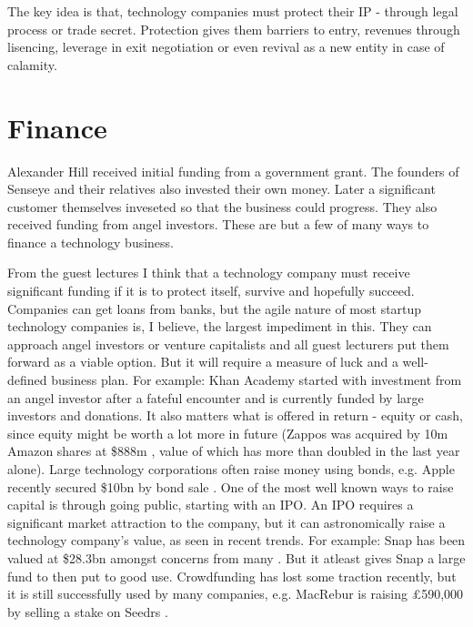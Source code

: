 \documentclass[twocolumn]{bmcart}%
\begin{document}
\par The key idea is that, technology companies must protect their IP - through legal process or trade secret. Protection gives them barriers to entry, revenues through lisencing, leverage in exit negotiation or even revival as a new entity in case of calamity.

\section*{Finance}

Alexander Hill received initial funding from a government grant. The founders of Senseye and their relatives also invested their own money. Later a significant customer themselves inveseted so that the business could progress. They also received funding from angel investors. These are but a few of many ways to finance a technology business.\\

\par From the guest lectures I think that a technology company must receive significant funding if it is to protect itself, survive and hopefully succeed. Companies can get loans from banks, but the agile nature of most startup technology companies is, I believe, the largest impediment in this. They can approach angel investors or venture capitalists and all guest lecturers put them forward as a viable option. But it will require a measure of luck and a well-defined business plan. For example: Khan Academy started with investment from an angel investor after a fateful encounter and is currently funded by large investors and donations. It also matters what is offered in return - equity or cash, since equity might be worth a lot more in future (Zappos was acquired by 10m Amazon shares at \$888m \cite{birchallwaters2009}, value of which has more than doubled in the last year alone). Large technology corporations often raise money using bonds, e.g. Apple recently secured \$10bn by bond sale \cite{platt2017}. One of the most well known ways to raise capital is through going public, starting with an IPO. An IPO requires a significant market attraction to the company, but it can astronomically raise a technology company's value, as seen in recent trends. For example: Snap has been valued at \$28.3bn \cite{bullockkuchler2017} amongst concerns from many \cite{masters2017}. But it atleast gives Snap a large fund to then put to good use. Crowdfunding has lost some traction recently, but it is still successfully used by many companies, e.g. MacRebur is raising £590,000 by selling a stake on Seedrs \cite{bounds2017}.\\
\end{document}
